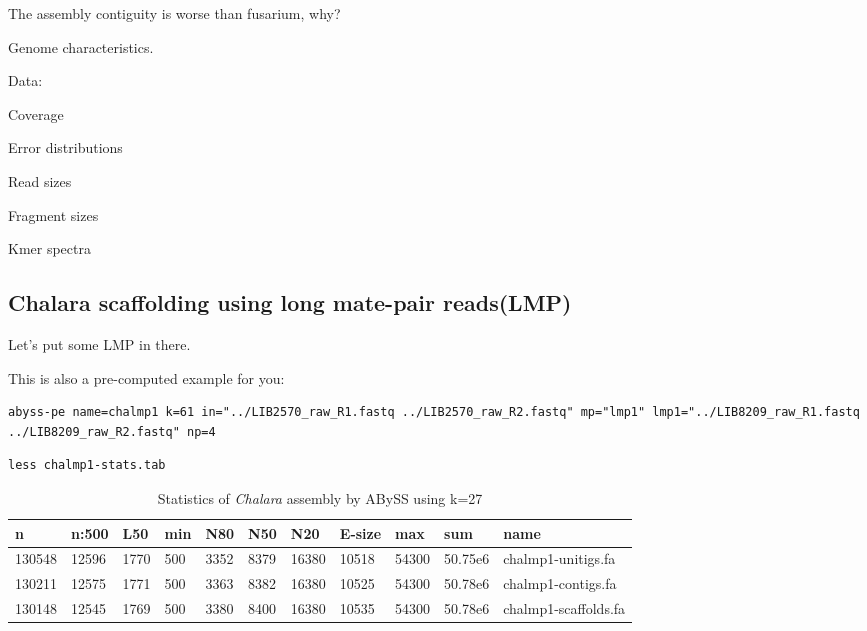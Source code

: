 \begin{questions}
The assembly contiguity is worse than fusarium, why?
\begin{answer}
\item Genome characteristics.
\item Data:
\item Coverage
\item Error distributions
\item Read sizes
\item Fragment sizes
\item  Kmer spectra
\end{answer}
\end{questions}

\subsection{Chalara scaffolding using long mate-pair reads(LMP)}

Let's put some LMP in there.

\begin{steps}
\begin{warning}
This is also a pre-computed example for you:
\begin{lstlisting}
abyss-pe name=chalmp1 k=61 in="../LIB2570_raw_R1.fastq ../LIB2570_raw_R2.fastq" mp="lmp1" lmp1="../LIB8209_raw_R1.fastq ../LIB8209_raw_R2.fastq" np=4
\end{lstlisting}
\end{warning}
\begin{lstlisting}
less chalmp1-stats.tab
\end{lstlisting}
\end{steps}

\begin{table}[H]
\small
  \centering
  \caption{Statistics of \textit{Chalara} assembly by ABySS using k=27}
    \begin{tabular}{lllllllllll}
    \toprule
    \textbf{n} & \textbf{n:500} & \textbf{L50} & \textbf{min} & \textbf{N80}& \textbf{N50}& \textbf{N20}& \textbf{E-size}& \textbf{max} & \textbf{sum}& \textbf{name}\\
    \midrule
    130548  & 12596  & 1770  & 500  & 3352  & 8379  & 16380  & 10518   & 54300  & 50.75e6  & chalmp1-unitigs.fa \\
    130211  & 12575  & 1771  & 500  & 3363  & 8382  & 16380  & 10525   & 54300  & 50.78e6  & chalmp1-contigs.fa \\
    130148  & 12545  & 1769  & 500  & 3380  & 8400  & 16380  & 10535   & 54300  & 50.78e6  & chalmp1-scaffolds.fa \\
    \bottomrule
    \end{tabular}
  \label{tab:chak27}
\end{table}


